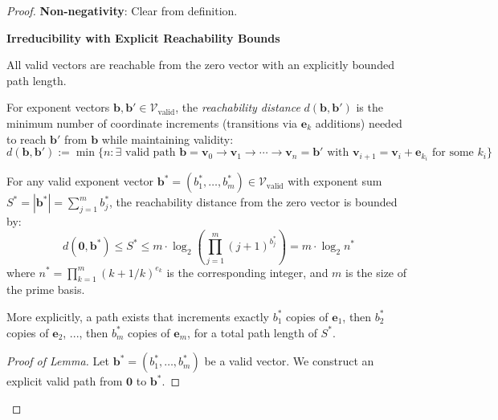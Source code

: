 \begin{proof}

\noindent \textbf{Non-negativity}: Clear from definition.

\noindent \textbf{Irreducibility with Explicit Reachability Bounds}

All valid vectors are reachable from the zero vector with an explicitly bounded path length.

\begin{definition}
For exponent vectors $\mathbf{b}, \mathbf{b}' \in \mathcal{V}_{\text{valid}}$, the \emph{reachability distance} $d(\mathbf{b}, \mathbf{b}')$ is the minimum number of coordinate increments (transitions via $\mathbf{e}_k$ additions) needed to reach $\mathbf{b}'$ from $\mathbf{b}$ while maintaining validity:
\begin{equation}
d(\mathbf{b}, \mathbf{b}') := \min\{n : \exists \text{ valid path } \mathbf{b} = \mathbf{v}_0 \to \mathbf{v}_1 \to \cdots \to \mathbf{v}_n = \mathbf{b}' \text{ with } \mathbf{v}_{i+1} = \mathbf{v}_i + \mathbf{e}_{k_i} \text{ for some } k_i\}
\end{equation}
\end{definition}

\begin{lemma}
\label{lem:reachability-bound}

For any valid exponent vector $\mathbf{b}^* = (b_1^*, \ldots, b_m^*) \in \mathcal{V}_{\text{valid}}$ with exponent sum $S^* = |\mathbf{b}^*| = \sum_{j=1}^m b_j^*$, the reachability distance from the zero vector is bounded by:
\begin{equation}
d(\mathbf{0}, \mathbf{b}^*) \leq S^* \leq m \cdot \log_2(\prod_{j=1}^m (j+1)^{b_j^*}) = m \cdot \log_2 n^*
\end{equation}
where $n^* = \prod_{k=1}^m (k+1/k)^{e_k}$ is the corresponding integer, and $m$ is the size of the prime basis.

More explicitly, a path exists that increments exactly $b_1^*$ copies of $\mathbf{e}_1$, then $b_2^*$ copies of $\mathbf{e}_2$, ..., then $b_m^*$ copies of $\mathbf{e}_m$, for a total path length of $S^*$.

\end{lemma}

\begin{proof}[Proof of Lemma]

Let $\mathbf{b}^* = (b_1^*, \ldots, b_m^*)$ be a valid vector. We construct an explicit valid path from $\mathbf{0}$ to $\mathbf{b}^*$.


\end{proof}
\end{proof}
